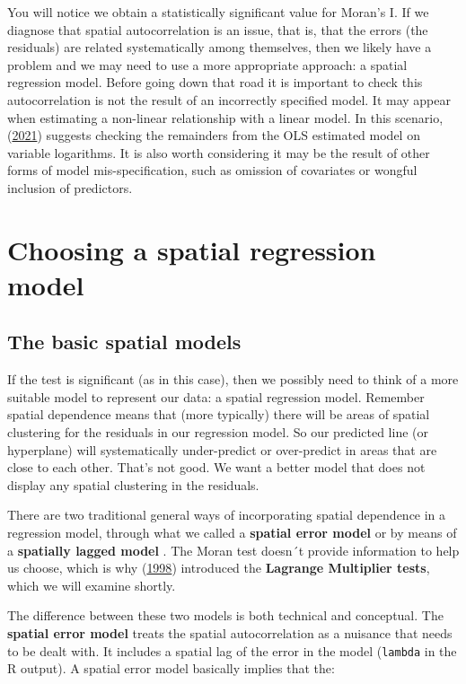 \documentclass[
  krantz2]{krantz}
\begin{document}
You will notice we obtain a statistically significant value for Moran's I. If we diagnose that spatial autocorrelation is an issue, that is, that the errors (the residuals) are related systematically among themselves, then we likely have a problem and we may need to use a more appropriate approach: a spatial regression model. Before going down that road it is important to check this autocorrelation is not the result of an incorrectly specified model. It may appear when estimating a non-linear relationship with a linear model. In this scenario, (\protect\hyperlink{ref-Kopczewska_2021}{2021}) suggests checking the remainders from the OLS estimated model on variable logarithms. It is also worth considering it may be the result of other forms of model mis-specification, such as omission of covariates or wongful inclusion of predictors.

\hypertarget{choosing-a-spatial-regression-model}{%
\section{Choosing a spatial regression model}\label{choosing-a-spatial-regression-model}}

\hypertarget{the-basic-spatial-models}{%
\subsection{The basic spatial models}\label{the-basic-spatial-models}}

If the test is significant (as in this case), then we possibly need to think of a more suitable model to represent our data: a spatial regression model. Remember spatial dependence means that (more typically) there will be areas of spatial clustering for the residuals in our regression model. So our predicted line (or hyperplane) will systematically under-predict or over-predict in areas that are close to each other. That's not good. We want a better model that does not display any spatial clustering in the residuals.

There are two traditional general ways of incorporating spatial dependence in a regression model, through what we called a \textbf{spatial error model} or by means of a \textbf{spatially lagged model} . The Moran test doesn´t provide information to help us choose, which is why (\protect\hyperlink{ref-Anselin_1998}{1998}) introduced the \textbf{Lagrange Multiplier tests}, which we will examine shortly.

The difference between these two models is both technical and conceptual. The \textbf{spatial error model} treats the spatial autocorrelation as a nuisance that needs to be dealt with. It includes a spatial lag of the error in the model
(\texttt{lambda} in the R output). A spatial error model basically implies that the:
\end{document}
